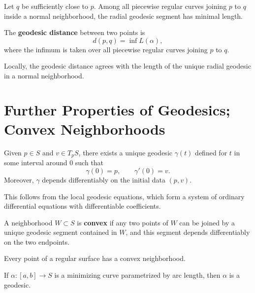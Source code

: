 \documentclass[12pt, oneside]{book}
\begin{document}
\begin{proposition}
    Let $q$ be sufficiently close to $p$.  Among all piecewise regular curves
    joining $p$ to $q$ inside a normal neighborhood, the radial geodesic segment
    has minimal length.
\end{proposition}

\begin{definition}
    The \textbf{geodesic distance} between two points is
    \[
        d(p,q)=\inf L(\alpha),
    \]
    where the infimum is taken over all piecewise regular curves joining $p$ to
    $q$.
\end{definition}

\begin{remark}
    Locally, the geodesic distance agrees with the length of the unique radial
    geodesic in a normal neighborhood.
\end{remark}

\section{Further Properties of Geodesics; Convex Neighborhoods}

\begin{theorem}
    Given $p\in S$ and $v\in T_pS$, there exists a unique geodesic
    $\gamma(t)$ defined for $t$ in some interval around $0$ such that
    \[
        \gamma(0)=p,\qquad \gamma'(0)=v.
    \]
    Moreover, $\gamma$ depends differentiably on the initial data $(p,v)$.
\end{theorem}

\begin{remark}
    This follows from the local geodesic equations, which form a system of
    ordinary differential equations with differentiable coefficients.
\end{remark}

\begin{definition}
    A neighborhood $W\subset S$ is \textbf{convex} if any two points of $W$ can
    be joined by a unique geodesic segment contained in $W$, and this segment
    depends differentiably on the two endpoints.
\end{definition}

\begin{proposition}
    Every point of a regular surface has a convex neighborhood.
\end{proposition}

\begin{proposition}
    If $\alpha:[a,b]\rightarrow S$ is a minimizing curve parametrized by arc
    length, then $\alpha$ is a geodesic.
\end{proposition}
\end{document}
